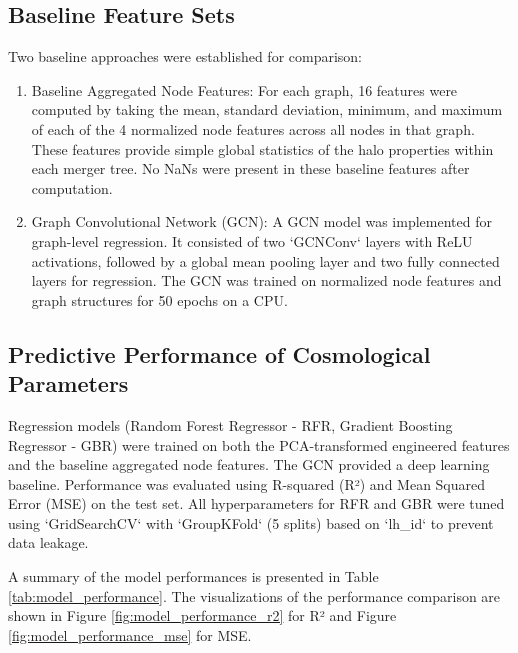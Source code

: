 \documentclass[twocolumn]{aastex631}
\begin{document}
\subsection{Baseline Feature Sets}

Two baseline approaches were established for comparison:
\begin{enumerate}
    \item Baseline Aggregated Node Features: For each graph, 16 features were computed by taking the mean, standard deviation, minimum, and maximum of each of the 4 normalized node features across all nodes in that graph. These features provide simple global statistics of the halo properties within each merger tree. No NaNs were present in these baseline features after computation.
    \item Graph Convolutional Network (GCN): A GCN model was implemented for graph-level regression. It consisted of two `GCNConv` layers with ReLU activations, followed by a global mean pooling layer and two fully connected layers for regression. The GCN was trained on normalized node features and graph structures for 50 epochs on a CPU.
\end{enumerate}

\subsection{Predictive Performance of Cosmological Parameters}

Regression models (Random Forest Regressor - RFR, Gradient Boosting Regressor - GBR) were trained on both the PCA-transformed engineered features and the baseline aggregated node features. The GCN provided a deep learning baseline. Performance was evaluated using R-squared (R²) and Mean Squared Error (MSE) on the test set. All hyperparameters for RFR and GBR were tuned using `GridSearchCV` with `GroupKFold` (5 splits) based on `lh\_id` to prevent data leakage.

A summary of the model performances is presented in Table \ref{tab:model_performance}. The visualizations of the performance comparison are shown in Figure \ref{fig:model_performance_r2} for R² and Figure \ref{fig:model_performance_mse} for MSE.
\end{document}
